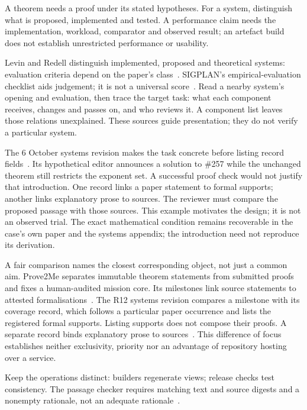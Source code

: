 A theorem needs a proof under its stated hypotheses. For a system, distinguish
what is proposed, implemented and tested. A performance claim needs the
implementation, workload, comparator and observed result; an artefact build
does not establish unrestricted performance or usability.

Levin and Redell distinguish implemented, proposed and theoretical systems:
evaluation criteria depend on the paper's class~\cite{levin-redell}. SIGPLAN's
empirical-evaluation checklist aids judgement; it is not a universal
score~\cite{sigplan-evaluation}. Read a nearby system's opening and evaluation,
then trace the target task: what each component receives, changes and passes
on, and who reviews it. A component list leaves those relations unexplained.
These sources guide presentation; they do not verify a particular system.

The 6 October systems revision makes the task concrete before listing record
fields~\cite[\S\S1,3; Appendix~B]{systems-current}. Its
hypothetical editor announces a solution to \#257 while the unchanged theorem
still restricts the exponent set. A successful proof check would not justify
that introduction. One record links a paper statement to formal supports;
another links explanatory prose to sources. The reviewer must compare the
proposed passage with those sources. This example motivates the design; it is
not an observed trial. The exact mathematical condition remains recoverable
in the case's own paper and the systems appendix; the introduction need not
reproduce its derivation.

A fair comparison names the closest corresponding object, not just a common
aim. Prove2Me separates immutable theorem statements from submitted proofs and
fixes a human-audited mission core. Its milestones link source statements to
attested formalisations~\cite[\S\S3--4]{prove2me}. The R12 systems revision
compares a milestone with its coverage record, which follows a particular
paper occurrence and lists the registered formal supports. Listing supports
does not compose their proofs. A separate record binds explanatory prose to
sources~\cite[related work]{systems-r12}. This difference of focus establishes
neither exclusivity, priority nor an advantage of repository hosting over a
service.

Keep the operations distinct: builders regenerate views; release checks test
consistency. The passage checker requires matching text and source digests
and a nonempty rationale, not an adequate rationale~\cite[\S3.2; Appendix~A]{systems-current}.


